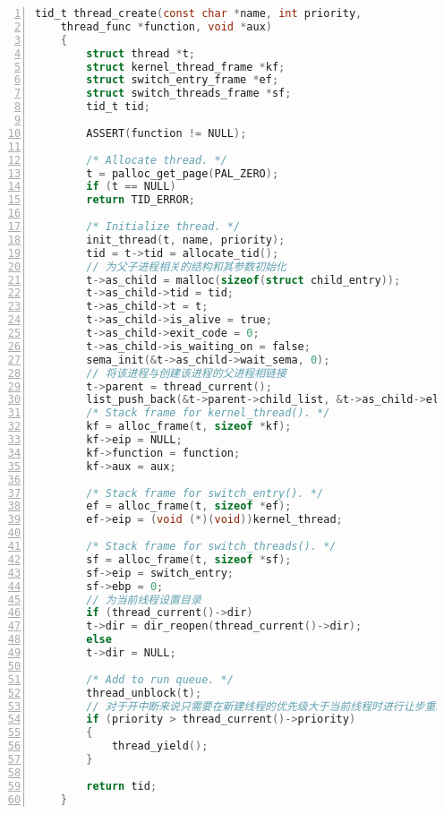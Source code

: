 \documentclass{article}
\begin{document}
	\begin{lstlisting}[xleftmargin = 4em,xrightmargin = 4em, aboveskip = 1em, numbers = left, language = C,title=src/threads/thread.c - create\_thread()]
    tid_t thread_create(const char *name, int priority,
    thread_func *function, void *aux)
    {
    	struct thread *t;
    	struct kernel_thread_frame *kf;
    	struct switch_entry_frame *ef;
    	struct switch_threads_frame *sf;
    	tid_t tid;
    	
    	ASSERT(function != NULL);
    	
    	/* Allocate thread. */
    	t = palloc_get_page(PAL_ZERO);
    	if (t == NULL)
    	return TID_ERROR;
    	
    	/* Initialize thread. */
    	init_thread(t, name, priority);
    	tid = t->tid = allocate_tid();
    	// 为父子进程相关的结构和其参数初始化
    	t->as_child = malloc(sizeof(struct child_entry));
    	t->as_child->tid = tid;
    	t->as_child->t = t;
    	t->as_child->is_alive = true;
    	t->as_child->exit_code = 0;
    	t->as_child->is_waiting_on = false;
    	sema_init(&t->as_child->wait_sema, 0);
    	// 将该进程与创建该进程的父进程相链接
    	t->parent = thread_current();
    	list_push_back(&t->parent->child_list, &t->as_child->elem);
    	/* Stack frame for kernel_thread(). */
    	kf = alloc_frame(t, sizeof *kf);
    	kf->eip = NULL;
    	kf->function = function;
    	kf->aux = aux;
    	
    	/* Stack frame for switch_entry(). */
    	ef = alloc_frame(t, sizeof *ef);
    	ef->eip = (void (*)(void))kernel_thread;
    	
    	/* Stack frame for switch_threads(). */
    	sf = alloc_frame(t, sizeof *sf);
    	sf->eip = switch_entry;
    	sf->ebp = 0;
    	// 为当前线程设置目录
    	if (thread_current()->dir)
    	t->dir = dir_reopen(thread_current()->dir);
    	else
    	t->dir = NULL;
    	
    	/* Add to run queue. */
    	thread_unblock(t);
    	// 对于开中断来说只需要在新建线程的优先级大于当前线程时进行让步重新调度即可
    	if (priority > thread_current()->priority)
    	{
    		thread_yield();
    	}
    	
    	return tid;
    }
	\end{lstlisting}
	
\end{document}
